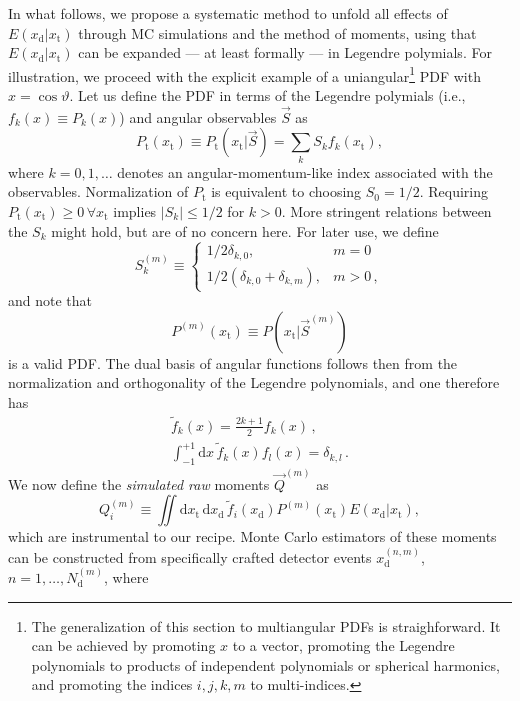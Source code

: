 \documentclass[aps,nofootinbib,preprintnumbers,prd,twocolumn]{revtex4-1}
\newcommand{\rmdx}[1]{\mbox{d} #1 \,} %
\newcommand{\subd}{_{\text{d}}}
\newcommand{\subt}{_{\text{t}}}
\renewcommand{\theta}{\vartheta}
\newcommand{\xd}{x\subd}
\newcommand{\xt}{x\subt}
\newcommand{\Ekernel}{E(\xd|\xt)}
\begin{document}
In what follows, we propose a systematic method to unfold all effects
of $\Ekernel$ through MC simulations and the method of moments,
using that $\Ekernel$ can be expanded --- at
least formally --- in Legendre polymials.  For illustration, we
proceed with the explicit example of a uniangular\footnote{%
  The generalization of this section to multiangular PDFs is
  straighforward. It can be achieved by promoting $x$ to a vector,
  promoting the Legendre polynomials to products of independent
  polynomials or spherical harmonics, and promoting the indices
  $i,j,k,m$ to multi-indices.  } PDF with $x = \cos\theta$. Let us
define the PDF in terms of the Legendre polymials (i.e., $f_k(x)
\equiv P_k(x)$) and angular observables $\vec{S}$ as
\begin{equation}
    P\subt(\xt) \equiv P\subt(\xt | \vec{S}) = \sum_k S_k f_k(\xt),
  \end{equation}
where $k = 0, 1, \dots$ denotes an angular-momentum-like index associated with the observables.
Normalization of $P\subt$ is equivalent to choosing $S_0 = 1/2$. Requiring $P\subt(\xt) \ge 0 \,\forall \xt$
implies $|S_k| \leq 1/2$ for $k > 0$. More stringent relations between the
$S_k$ might hold, but are of no concern here. For later use, we define
\begin{equation}
  \label{eq:def-Sk}
  S^{(m)}_k \equiv
  \begin{cases}
    1/2 \delta_{k,0}, & m=0\\
    1/2 (\delta_{k,0} + \delta_{k,m}), & m>0 \,,
  \end{cases}
\end{equation}
and note that
\begin{equation}
    P^{(m)}(\xt) \equiv P(\xt | \vec{S}^{(m)})
\end{equation}
is a valid PDF. The dual basis of angular functions follows then from the normalization
and orthogonality of the Legendre polynomials, and one therefore has
\begin{gather}
    \tilde{f}_k(x) = \frac{2 k + 1}{2} f_k(x)\,,\\
    \int_{-1}^{+1} \rmdx{x} \tilde{f}_k(x) f_l(x) = \delta_{k,l}\,.
\end{gather}
We now define the \emph{simulated raw} moments $\vec{Q}^{(m)}$ as
\begin{equation}
    \label{eq:analytic-raw-moments}
    Q_i^{(m)} \equiv \iint \rmdx{\xt} \rmdx{\xd} \tilde{f}_i(\xd) P^{(m)}(\xt) \Ekernel,
\end{equation}
which are instrumental to our recipe. Monte Carlo estimators of these moments can be constructed from specifically crafted detector events $x_\text{d}^{(n,m)}$, $n = 1, \dots, N_\text{d}^{(m)}$, where
\end{document}
